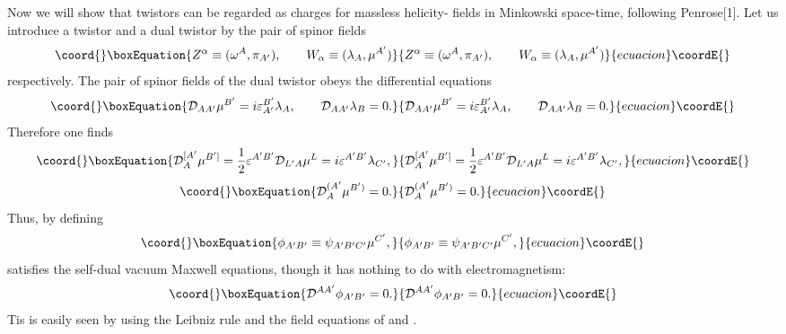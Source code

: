 \documentclass[a4paper,12pt]{article}
\begin{document}
Now we will show that twistors can be regarded as charges for massless helicity-\coordHE{} fields in Minkowski space-time, following Penrose[1]. 
Let us introduce a twistor \coordHE{} and a dual twistor \coordHE{} by the pair of spinor fields
\begin{equation}\coord{}\boxEquation{
Z^\alpha\equiv (\omega^A,\pi_{A'}),\ \ \ \ \ \ W_\alpha\equiv (\lambda_A,\mu^{A'})
}{
Z^\alpha\equiv (\omega^A,\pi_{A'}),\ \ \ \ \ \ W_\alpha\equiv (\lambda_A,\mu^{A'})
}{ecuacion}\coordE{}\end{equation}
respectively. The pair of spinor fields of the dual twistor obeys the differential equations
\begin{equation}\coord{}\boxEquation{
{\cal D}_{AA'}\mu^{B'}=i\varepsilon_{A'}^{B'}\lambda_A,\ \ \ \ \ \ {\cal D}_{AA'}\lambda_B=0.
}{
{\cal D}_{AA'}\mu^{B'}=i\varepsilon_{A'}^{B'}\lambda_A,\ \ \ \ \ \ {\cal D}_{AA'}\lambda_B=0.
}{ecuacion}\coordE{}\end{equation}
Therefore one finds
\begin{equation}\coord{}\boxEquation{
{\cal D}^{[A'}_A\mu^{B']}=\frac{1}{2}\varepsilon^{A'B'}{\cal D}_{L'A}\mu^L
=i\varepsilon^{A'B'}\lambda_{C'},
}{
{\cal D}^{[A'}_A\mu^{B']}=\frac{1}{2}\varepsilon^{A'B'}{\cal D}_{L'A}\mu^L
=i\varepsilon^{A'B'}\lambda_{C'},
}{ecuacion}\coordE{}\end{equation}
\begin{equation}\coord{}\boxEquation{
{\cal D}^{(A'}_A\mu^{B')}=0.
}{
{\cal D}^{(A'}_A\mu^{B')}=0.
}{ecuacion}\coordE{}\end{equation}
Thus, by defining 
\begin{equation}\coord{}\boxEquation{
\phi_{A'B'}\equiv \psi_{A'B'C'}\mu^{C'},
}{
\phi_{A'B'}\equiv \psi_{A'B'C'}\mu^{C'},
}{ecuacion}\coordE{}\end{equation}
\coordHE{} satisfies the self-dual vacuum Maxwell equations, though it has nothing to do with electromagnetism:
\begin{equation}\coord{}\boxEquation{
{\cal D}^{AA'}\phi_{A'B'}=0.
}{
{\cal D}^{AA'}\phi_{A'B'}=0.
}{ecuacion}\coordE{}\end{equation}
Tis is easily seen by using the Leibniz rule and the field equations of \coordHE{} and \coordHE{}.
\end{document}
